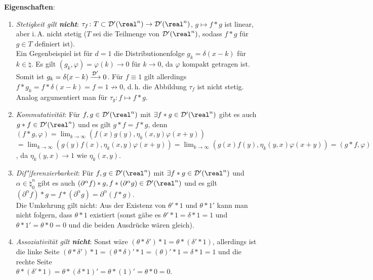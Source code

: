 \textbf{Eigenschaften}:
\begin{enumerate}
    \item
    \emph{Stetigkeit gilt \textbf{nicht}}:
    $\tau_f\colon T \subset \D'(\real^n) \rightarrow \D'(\real^n)$,
    $g \mapsto f \ast g$ ist linear,
    aber i.\,A. nicht stetig ($T$ sei die Teilmenge von $\D'(\real^n)$,
    sodass $f \ast g$ für $g \in T$ definiert ist).\\
    Ein Gegenbeispiel ist für $d = 1$ die Distributionenfolge
    $g_k = \delta(x - k)$ für $k \in \natural$.
    Es gilt $(g_k, \varphi) = \varphi(k) \to 0$ für $k \to 0$,
    da $\varphi$ kompakt getragen ist.
    Somit ist $g_k = \delta(x - k) \xrightarrow{\mathcal{D}'} 0$.
    Für $f \equiv 1$ gilt allerdings
    $f \ast g_k = f \ast \delta(x - k) = f = 1 \not\to 0$,
    d.\,h. die Abbildung $\tau_f$ ist nicht stetig.
    Analog argumentiert man für $\tau_g\colon f \mapsto f \ast g$.
    
    \item
    \emph{Kommutativität}:
    Für $f, g \in \D'(\real^n)$ mit $\exists f \ast g \in \D'(\real^n)$
    gibt es auch $g \ast f \in \D'(\real^n)$ und es gilt
    $g \ast f = f \ast g$, denn
    $(f \ast g, \varphi) =
    \lim_{k \to \infty} (f(x)g(y), \eta_k(x, y)\varphi(x + y))$\\
    $= \lim_{k \to \infty} (g(y)f(x), \eta_k(x, y)\varphi(x + y)) =
    \lim_{k \to \infty} (g(x)f(y), \eta_k(y, x)\varphi(x + y)) =
    (g \ast f, \varphi)$,
    da $\eta_k(y, x) \to 1$ wie $\eta_k(x, y)$.
    
    \item
    \emph{Dif"|ferenzierbarkeit}:
    Für $f, g \in \D'(\real^n)$ mit $\exists f \ast g \in \D'(\real^n)$
    und $\alpha \in \natural_0^n$
    gibt es auch $(\partial^\alpha f) \ast g,
    f \ast (\partial^\alpha g) \in \D'(\real^n)$ und es gilt
    $(\partial^\alpha f) \ast g = f \ast (\partial^\alpha g) =
    \partial^\alpha (f \ast g)$.\\
    Die Umkehrung gilt nicht:
    Aus der Existenz von $\theta' \ast 1$ und $\theta \ast 1'$
    kann man nicht folgern, dass $\theta \ast 1$ existiert
    (sonst gäbe es $\theta' \ast 1 = \delta \ast 1 = 1$ und
    $\theta \ast 1' = \theta \ast 0 = 0$ und
    die beiden Ausdrücke wären gleich).
    
    \item
    \emph{Assoziativität gilt \textbf{nicht}}:
    Sonst wäre $(\theta \ast \delta') \ast 1 = \theta \ast (\delta' \ast 1)$,
    allerdings ist die linke Seite
    $(\theta \ast \delta') \ast 1 = (\theta \ast \delta)' \ast 1 =
    (\theta)' \ast 1 = \delta \ast 1 = 1$ und die rechte Seite\\
    $\theta \ast (\delta' \ast 1) = \theta \ast (\delta \ast 1)' =
    \theta \ast (1)' = \theta \ast 0 = 0$.
    

\end{enumerate}
